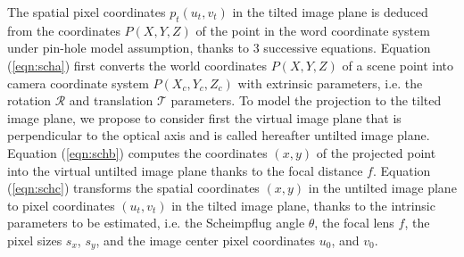 \documentclass[12pt]{article}
\begin{document}
%
%
%


The spatial pixel coordinates $p_t(u_t,v_t)$ in the tilted image plane is deduced from the coordinates $P(X,Y,Z)$ of the point in the word coordinate system under pin-hole model assumption, thanks to 3 successive equations. 
 Equation (\ref{eqn:scha}) first converts the world coordinates $P(X,Y,Z)$ of a scene point into camera coordinate system $P(X_c,Y_c,Z_c)$ with extrinsic parameters, i.e. the rotation $\mathcal{R}$ and translation $\mathcal{T}$ parameters. To model the projection to the tilted image plane, we propose to consider first the virtual image plane that is perpendicular to the optical axis and is called hereafter untilted image plane.
 Equation  (\ref{eqn:schb})  computes the coordinates $(x,y)$ of the projected point into the virtual untilted image plane thanks to the focal distance $f$. Equation (\ref{eqn:schc}) transforms the spatial coordinates $(x,y)$ in the untilted image plane to pixel coordinates $(u_t,v_t)$ in the tilted image plane, thanks to the intrinsic parameters to be estimated, i.e. the Scheimpflug angle $\theta$, the focal lens  $f$,  the pixel sizes $s_x$, $s_y$, and the image center pixel coordinates $u_0$, and $v_0$. 
 
\end{document}
